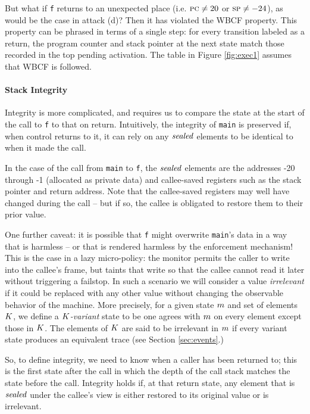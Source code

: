 \documentclass[10pt,conference]{ieeetran}%
\theoremstyle{definition}
\begin{document}
But what if {\tt f} returns to an unexpected place (i.e. \(\textsc{pc} \neq 20\) or \(\textsc{sp} \neq -24\)),
as would be the case in attack (d)? Then it has violated the WBCF property.
This property can be phrased in terms of a single step: for every transition
labeled as a return, the program counter and stack pointer at the next state
match those recorded in the top pending activation. The table in Figure \ref{fig:exec1}
assumes that WBCF is followed.

\paragraph*{Stack Integrity}

Integrity is more complicated, and requires us to compare the state at the start of
the call to {\tt f} to that on return. Intuitively, the integrity of {\tt main}
is preserved if, when control returns to it, it can rely on any \(\mathit{sealed}\) elements
to be identical to when it made the call.

In the case of the call from {\tt main} to {\tt f}, the \(\mathit{sealed}\) elements are the
addresses -20 through -1 (allocated as private data) and callee-saved registers such as
the stack pointer and return address.
Note that the callee-saved registers may well have changed during the call -- but if
so, the callee is obligated to restore them to their prior value.

One further caveat: it is possible that {\tt f} might overwrite {\tt main}'s data
in a way that is harmless -- or that is rendered harmless by the enforcement mechanism!
This is the case in a lazy micro-policy: the monitor permits the caller to write into the
callee's frame, but taints that write so that the callee cannot read it later without
triggering a failstop. In such a scenario we will consider a value {\it irrelevant}
if it could be replaced with any other value without changing the observable behavior
of the machine. More precisely, for a given state \(m\) and set of elements \(K\),
we define a {\em \(K\)-variant} state to be one agrees with \(m\) on every element except those
in \(K\). The elements of \(K\) are said to be irrelevant in \(m\) if every
variant state produces an equivalent trace (see Section \ref{sec:events}.)

So, to define integrity, we need to know when a caller has been returned to;
this is the first state after the call in which the depth of the call stack
matches the state before the call. Integrity holds if, at that return state,
any element that is \(\mathit{sealed}\) under the callee's view is either restored
to its original value or is irrelevant.
\end{document}
